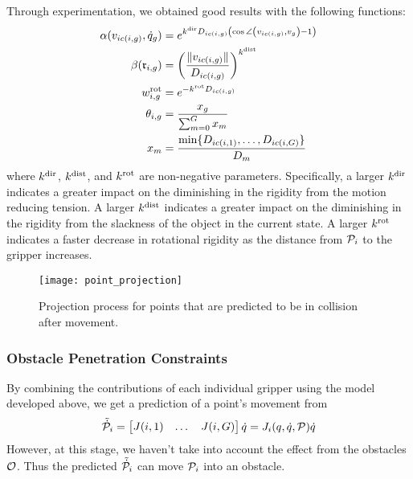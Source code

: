 Through experimentation, we obtained good results with the following functions:
\begin{equation}
\begin{split}
    \alpha(v_{i c(i, g)}, \dot{q}_g)  &= e^{k^\textrm{dir} D_{i c(i, g)} \left(\cos \angle \left( v_{i c(i, g)}, v_g \right) - 1\right)} \\
    \beta(\mathfrak{r}_{i, g})    &= \left( \frac{\| v_{i c(i, g)} \|}{D_{i c(i, g)}} \right) ^{k^\textrm{dist}} \\
    w^{\textrm{rot}}_{i, g}  &= e^{-k^{\textrm{rot}} D_{i c(i, g)}} \\
    \theta_{i, g}    &= \frac{x_g}{\sum_{m = 0}^G x_m}\\
    x_m             &= \frac{\textrm{min} \{D_{i c(i, 1)}, \dots , D_{i c(i, G)}\}}{D_m} 
\end{split}
\label{eq:directional_rigidity_factors}
\end{equation}
where $k^\textrm{dir}$, $k^\textrm{dist}$, and $k^{\textrm{rot}}$ are non-negative parameters. Specifically, a larger $k^\textrm{dir}$ indicates a greater impact on the diminishing in the rigidity from the motion reducing tension. A larger $k^\textrm{dist}$ indicates a greater impact on the diminishing in the rigidity from the slackness of the object in the current state. A larger $k^{\textrm{rot}}$ indicates a faster decrease in rotational rigidity as the distance from $\mathcal{P}_i$ to the gripper increases. 

\begin{figure}
    \centering
    \texttt{[image: point\_projection]}
    \caption{Projection process for points that are predicted to be in collision after movement.}
    \label{fig:point_projection}
\end{figure}

\subsubsection{Obstacle Penetration Constraints}

By combining the contributions of each individual gripper using the model developed above, we get a prediction of a point's movement from
\begin{equation}
    \tilde{\dot{\mathcal{P}}}_i = \begin{bmatrix}
        J(i, 1) & \dots & 
        J(i, G)
    \end{bmatrix} \dot{q} = J_{i}(q, \dot{q}, \mathcal{P}) \dot{q}
\end{equation}
However, at this stage, we haven't take into account the effect from the obstacles $\mathcal{O}$. Thus the predicted $\tilde{\dot{\mathcal{P}}}_i$ can move $\mathcal{P}_i$ into an obstacle.

